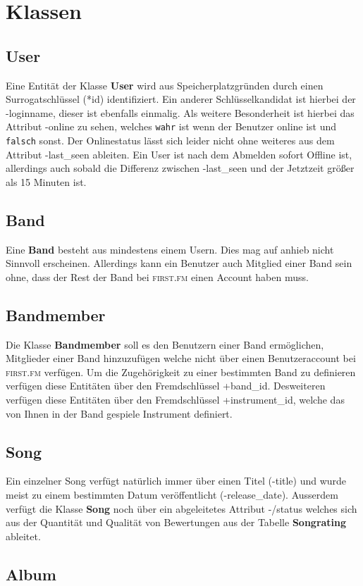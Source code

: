 \documentclass[11pt,a4paper,DIV=9]{scrartcl}
\begin{document}
\section{Klassen}
  \subsection{User}
    Eine Entität der Klasse \textbf{User} wird aus Speicherplatzgründen durch einen Surrogatschlüssel (*id) identifiziert. Ein anderer Schlüsselkandidat ist hierbei der -loginname, dieser ist ebenfalls einmalig. Als weitere Besonderheit ist hierbei das Attribut -online zu sehen, welches \texttt{wahr} ist wenn der Benutzer online ist und \texttt{falsch} sonst. Der Onlinestatus lässt sich leider nicht ohne weiteres aus dem Attribut -last\_seen ableiten. Ein User ist nach dem Abmelden sofort Offline ist, allerdings auch sobald die Differenz zwischen -last\_seen und der Jetztzeit größer als 15 Minuten ist.
  \subsection{Band}
    Eine \textbf{Band} besteht aus mindestens einem Usern. Dies mag auf anhieb nicht Sinnvoll erscheinen. Allerdings kann ein Benutzer auch Mitglied einer Band sein ohne, dass der Rest der Band bei \textsc{first.fm} einen Account haben muss. 
  \subsection{Bandmember}
    Die Klasse \textbf{Bandmember} soll es den Benutzern einer Band ermöglichen, Mitglieder einer Band hinzuzufügen welche nicht über einen Benutzeraccount bei \textsc{first.fm} verfügen. Um die Zugehörigkeit zu einer bestimmten Band zu definieren verfügen diese Entitäten über den Fremdschlüssel +band\_id. Desweiteren verfügen diese Entitäten über den Fremdschlüssel +instrument\_id, welche das von Ihnen in der Band gespiele Instrument definiert.
  \subsection{Song}
    Ein einzelner Song verfügt natürlich immer über einen Titel (-title) und wurde meist zu einem bestimmten Datum veröffentlicht (-release\_date). Ausserdem verfügt die Klasse \textbf{Song} noch über ein abgeleitetes Attribut -/status welches sich aus der Quantität und Qualität von Bewertungen aus der Tabelle \textbf{Songrating} ableitet. 
  \subsection{Album}
\end{document}
